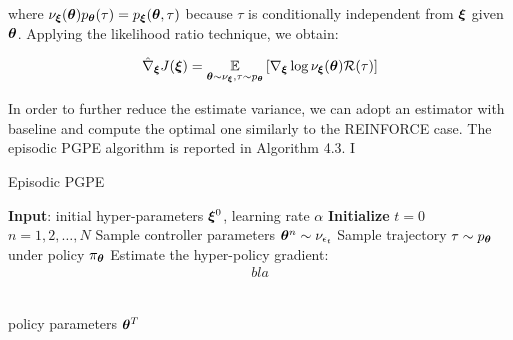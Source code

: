 where $\nu_{\boldsymbol{\xi}}(\boldsymbol{\theta})p_{\boldsymbol{\theta}}(\tau)=p_{\boldsymbol{\xi}}(\boldsymbol{\theta},\tau)$ because $\tau$ is conditionally independent from $\boldsymbol{\xi}$ given $\boldsymbol{\theta}$. Applying the likelihood ratio technique, we obtain:

\begin{align}
\hat{\nabla}_{\boldsymbol{\xi}}J(\boldsymbol{\xi}) = \underset{\boldsymbol{\theta}\sim\nu_{\boldsymbol{\xi}}, \tau\sim p_{\boldsymbol{\theta}}}{\mathbb{E}}\left[{\nabla_{\boldsymbol{\xi}}\log\nu_{\boldsymbol{\xi}}(\boldsymbol{\theta})\mathcal{R}(\tau)}\right] 
\end{align}

In order to further reduce the estimate variance, we can adopt an estimator with baseline and compute the optimal one similarly to the REINFORCE case. The episodic \gls{PGPE} algorithm is reported in Algorithm 4.3. I

\begin{algorithm}[t]
	\caption{Episodic PGPE}
	\label{alg:PG}
	\begin{algorithmic}[1]
	\State \textbf{Input}: initial hyper-parameters $\boldsymbol{\xi}^0$, learning rate $\alpha$
	\State \textbf{Initialize} $t=0$
		\For $n=1,2,\dots,N$
			\State Sample controller parameters $\boldsymbol{\theta}^n \sim\nu_{\epsilon_t}$
			\State Sample trajectory $\tau\sim p_{\boldsymbol{\theta}}$ under policy $\pi_{\boldsymbol{\theta}}$
		\EndFor 
		\State Estimate the hyper-policy gradient:
		\begin{align*}
		bla
		\end{align*}
			
	\EndWhile \\
	\Return policy parameters $\boldsymbol{\theta}^{T}$
	\end{algorithmic}
\end{algorithm}


